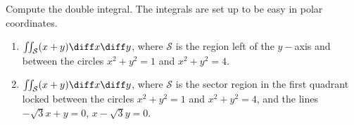 Compute the double integral. The integrals are set up to be easy in polar coordinates.

\begin{enumerate}
\item $\iint_{\mathcal S} (x+y)\diff x\diff y $, where $\mathcal S$ is the region left of the $y-$axis and between the circles $x^2+y^2=1$ and $x^2+y^2=4$.

\item $\iint_{\mathcal S} (x+y) \diff x\diff y $, where $\mathcal S$ is the sector region in the first quadrant  locked between the circles $x^2+y^2=1$ and $x^2+y^2=4$, and the lines $-\sqrt{3}x+y=0$, $ x-\sqrt{3} y=0$.

\end{enumerate}